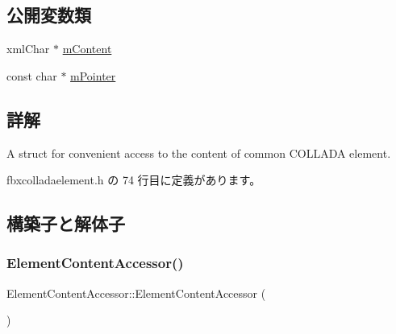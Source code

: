 \subsection*{公開変数類}
\begin{DoxyCompactItemize}
\item 
xml\+Char $\ast$ \hyperlink{struct_element_content_accessor_a3b06ccf10e2deb2e1308bb5bc4bf9532}{m\+Content}
\item 
const char $\ast$ \hyperlink{struct_element_content_accessor_a086d33aecd0a61b63fb21ff4d744e463}{m\+Pointer}
\end{DoxyCompactItemize}


\subsection{詳解}
A struct for convenient access to the content of common C\+O\+L\+L\+A\+DA element. 

 fbxcolladaelement.\+h の 74 行目に定義があります。



\subsection{構築子と解体子}
\mbox{\label{struct_element_content_accessor_a59a1e00643f9f94ff680d2f63f80b0cd}} 
\subsubsection{\texorpdfstring{Element\+Content\+Accessor()}{ElementContentAccessor()}\hspace{0.1cm}{\footnotesize\ttfamily [1/2]}}
{\footnotesize\ttfamily Element\+Content\+Accessor\+::\+Element\+Content\+Accessor (\begin{DoxyParamCaption}{ }\end{DoxyParamCaption})}

\mbox{\label{struct_element_content_accessor_af1a83e6fae2facae0b94d0c7332e0a2e}} 
